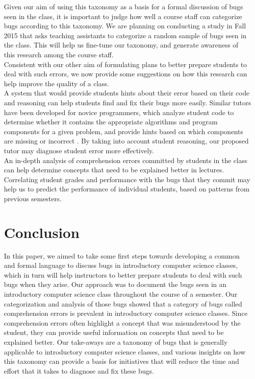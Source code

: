 \documentclass{sig-alternate}
\begin{document}
Given our aim of using this taxonomy as a basis for a formal discussion of bugs seen in the class, it is important to judge how well a course staff can categorize bugs according to this taxonomy. We are planning on conducting a study in Fall 2015 that asks teaching assistants to categorize a random sample of bugs seen in the class. This will help us fine-tune our taxonomy, and generate awareness of this research among the course staff.\\

Consistent with our other aim of formulating plans to better prepare students to deal with such errors, we now provide some suggestions on how this research can help improve the quality of a class.\\

A system that would provide students hints about their error based on their code and reasoning can help students find and fix their bugs more easily. Similar tutors have been developed for novice programmers, which analyze student code to determine whether it contains the appropriate algorithms and program components for a given problem, and provide hints based on which components are missing or incorrect \cite{Sudol-DeLyser14}. By taking into account student reasoning, our proposed tutor may diagnose student error more effectively.\\

An in-depth analysis of comprehension errors committed by students in the class can help determine concepts that need to be explained better in lectures.\\

Correlating student grades and performance with the bugs that they commit may help us to predict the performance of individual students, based on patterns from previous semesters.

\section{Conclusion}

In this paper, we aimed to take some first steps towards developing a common and formal language to discuss bugs in introductory computer science classes, which in turn will help instructors to better prepare students to deal with such bugs when they arise. Our approach was to document the bugs seen in an introductory computer science class throughout the course of a semester. Our categorization and analysis of those bugs showed that a category of bugs called comprehension errors is prevalent in introductory computer science classes. Since comprehension errors often highlight a concept that was misunderstood by the student, they can provide useful information on concepts that need to be explained better. Our take-aways are a taxonomy of bugs that is generally applicable to introductory computer science classes, and various insights on how this taxonomy can provide a basis for initiatives that will reduce the time and effort that it takes to diagnose and fix these bugs.



\balancecolumns
\end{document}
